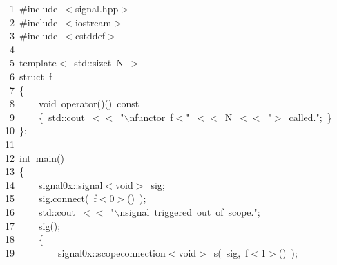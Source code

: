 \documentclass[9pt,onside,a4paper]{article}
\newcommand{\hlstd}[1]{\textcolor[rgb]{0.2,0,0.4}{#1}}
\newcommand{\hlnum}[1]{\textcolor[rgb]{0.2,0.73,0.02}{#1}}
\newcommand{\hlesc}[1]{\textcolor[rgb]{0.65,0.09,0.38}{#1}}
\newcommand{\hlstr}[1]{\textcolor[rgb]{0.09,0.38,0.65}{#1}}
\newcommand{\hlppc}[1]{\textcolor[rgb]{0.33,0.45,0.69}{#1}}
\newcommand{\hlopt}[1]{\textcolor[rgb]{0.33,0.33,0.33}{#1}}
\newcommand{\hllin}[1]{\textcolor[rgb]{0.6,0.6,0.6}{#1}}
\newcommand{\hlkwb}[1]{\textcolor[rgb]{0.96,0.55,0.14}{#1}}
\newcommand{\hlkwc}[1]{\textcolor[rgb]{0,0,1}{#1}}
\newcommand{\hlkwd}[1]{\textcolor[rgb]{0.82,0.11,0.93}{#1}}
\begin{document}
\noindent
\ttfamily
\hlstd{}\hllin{\ \ \ \ 1\ }\hlppc{\#include\ $<$signal.hpp$>$}\\
\hllin{\ \ \ \ 2\ }\hlstd{}\hlppc{\#include\ $<$iostream$>$}\\
\hllin{\ \ \ \ 3\ }\hlstd{}\hlppc{\#include\ $<$cstddef$>$}\\
\hllin{\ \ \ \ 4\ }\hlstd{}\\
\hllin{\ \ \ \ 5\ }\hlkwc{template}\hlstd{}\hlopt{$<$\ }\hlstd{std}\hlopt{::}\hlstd{}\hlkwb{size\textunderscore t\ }\hlstd{N\ }\hlopt{$>$}\\
\hllin{\ \ \ \ 6\ }\hlstd{}\hlkwb{struct\ }\hlstd{f}\\
\hllin{\ \ \ \ 7\ }\hlopt{\{}\\
\hllin{\ \ \ \ 8\ }\hlstd{}\hlstd{\ \ \ \ }\hlstd{}\hlkwb{void\ }\hlstd{}\hlkwc{operator}\hlstd{}\hlopt{()()\ }\hlstd{}\hlkwb{const\ }\\
\hllin{\ \ \ \ 9\ }\hlstd{}\hlstd{\ \ \ \ }\hlstd{}\hlopt{\{\ }\hlstd{std}\hlopt{::}\hlstd{cout\ }\hlopt{$<$$<$\ }\hlstd{}\hlstr{"}\hlesc{$\backslash$n}\hlstr{functor\ f$<$"}\hlstd{\ }\hlopt{$<$$<$\ }\hlstd{N\ }\hlopt{$<$$<$\ }\hlstd{}\hlstr{"$>$\ called."}\hlstd{}\hlopt{;\ \}}\\
\hllin{\ \ \ 10\ }\hlstd{}\hlopt{\};}\\
\hllin{\ \ \ 11\ }\hlstd{}\\
\hllin{\ \ \ 12\ }\hlkwb{int\ }\hlstd{}\hlkwd{main}\hlstd{}\hlopt{()}\\
\hllin{\ \ \ 13\ }\hlstd{}\hlopt{\{}\\
\hllin{\ \ \ 14\ }\hlstd{}\hlstd{\ \ \ \ }\hlstd{signal0x}\hlopt{::}\hlstd{signal}\hlopt{$<$}\hlstd{}\hlkwb{void}\hlstd{}\hlopt{$>$\ }\hlstd{sig}\hlopt{;}\\
\hllin{\ \ \ 15\ }\hlstd{}\hlstd{\ \ \ \ }\hlstd{sig}\hlopt{.}\hlstd{}\hlkwd{connect}\hlstd{}\hlopt{(\ }\hlstd{f}\hlopt{$<$}\hlstd{}\hlnum{0}\hlstd{}\hlopt{$>$()\ );}\\
\hllin{\ \ \ 16\ }\hlstd{}\hlstd{\ \ \ \ }\hlstd{std}\hlopt{::}\hlstd{cout\ }\hlopt{$<$$<$\ }\hlstd{}\hlstr{"}\hlesc{$\backslash$n}\hlstr{signal\ triggered\ out\ of\ scope."}\hlstd{}\hlopt{;}\\
\hllin{\ \ \ 17\ }\hlstd{}\hlstd{\ \ \ \ }\hlstd{}\hlkwd{sig}\hlstd{}\hlopt{();}\\
\hllin{\ \ \ 18\ }\hlstd{}\hlstd{\ \ \ \ }\hlstd{}\hlopt{\{}\\
\hllin{\ \ \ 19\ }\hlstd{}\hlstd{\ \ \ \ \ \ \ \ }\hlstd{signal0x}\hlopt{::}\hlstd{scope\textunderscore connection}\hlopt{$<$}\hlstd{}\hlkwb{void}\hlstd{}\hlopt{$>$\ }\hlstd{}\hlkwd{s}\hlstd{}\hlopt{(\ }\hlstd{sig}\hlopt{,\ }\hlstd{f}\hlopt{$<$}\hlstd{}\hlnum{1}\hlstd{}\hlopt{$>$()\ );}\\
\end{document}
